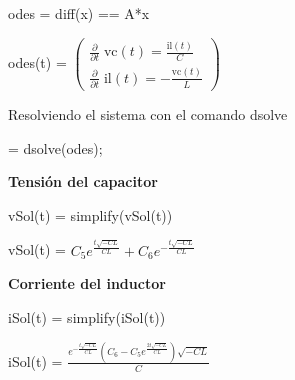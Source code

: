 \documentclass[10pt,a4paper]{article} %
\begin{document}
	\begin{matlabcode}
		odes = diff(x) == A*x
	\end{matlabcode}
	\begin{matlabsymbolicoutput}
		odes(t) = 
		$\displaystyle \left(\begin{array}{c}
		\frac{\partial }{\partial t}\;\textrm{vc}\left(t\right)=\frac{\textrm{il}\left(t\right)}{C}\\
		\frac{\partial }{\partial t}\;\textrm{il}\left(t\right)=-\frac{\textrm{vc}\left(t\right)}{L}
		\end{array}\right)$
	\end{matlabsymbolicoutput}
	
	\begin{par}
		\begin{flushleft}
			Resolviendo el sistema con el comando dsolve
		\end{flushleft}
	\end{par}
	
	\begin{matlabcode}
		 = dsolve(odes);
	\end{matlabcode}
	
	\begin{par}
		\begin{flushleft}
			\textbf{Tensión del capacitor}
		\end{flushleft}
	\end{par}
	
	\begin{matlabcode}
		vSol(t) = simplify(vSol(t))
	\end{matlabcode}
	\begin{matlabsymbolicoutput}
		vSol(t) = 
		$\displaystyle C_5  e^{\frac{t \sqrt{-C L}}{C L}} +C_6  e^{-\frac{t \sqrt{-C L}}{C L}} $
	\end{matlabsymbolicoutput}
	
	\begin{par}
		\begin{flushleft}
			\textbf{Corriente del inductor}
		\end{flushleft}
	\end{par}
	
	\begin{matlabcode}
		iSol(t) = simplify(iSol(t))
	\end{matlabcode}
	\begin{matlabsymbolicoutput}
		iSol(t) = 
		$\displaystyle \frac{e^{-\frac{t \sqrt{-C L}}{C L}}  {\left(C_6 -C_5  e^{\frac{2 t \sqrt{-C L}}{C L}} \right)} \sqrt{-C L}}{C}$
	\end{matlabsymbolicoutput}
	
\end{document}
